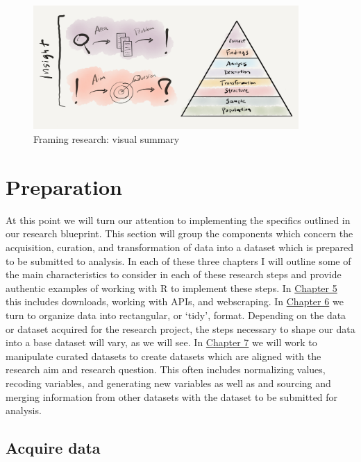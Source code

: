 \documentclass[
  letterpaper,
]{latex/krantz}
\begin{document}
\begin{figure}

{\centering \includegraphics[width=0.9\textwidth,height=\textheight]{./figures/framing-research/framing-research-visual-summary.png}

}

\caption{\label{fig-framing-research-visual-summary-graphic}Framing
research: visual summary}

\end{figure}

\part{Preparation}

At this point we will turn our attention to implementing the specifics
outlined in our research blueprint. This section will group the
components which concern the acquisition, curation, and transformation
of data into a dataset which is prepared to be submitted to analysis. In
each of these three chapters I will outline some of the main
characteristics to consider in each of these research steps and provide
authentic examples of working with R to implement these steps. In
\protect\hyperlink{acquire-data}{Chapter 5} this includes downloads,
working with APIs, and webscraping. In
\protect\hyperlink{curate-data}{Chapter 6} we turn to organize data into
rectangular, or `tidy', format. Depending on the data or dataset
acquired for the research project, the steps necessary to shape our data
into a base dataset will vary, as we will see. In
\protect\hyperlink{transform-data}{Chapter 7} we will work to manipulate
curated datasets to create datasets which are aligned with the research
aim and research question. This often includes normalizing values,
recoding variables, and generating new variables as well as and sourcing
and merging information from other datasets with the dataset to be
submitted for analysis.

\hypertarget{sec-acquire-data}{%
\chapter{Acquire data}\label{sec-acquire-data}}
\end{document}
